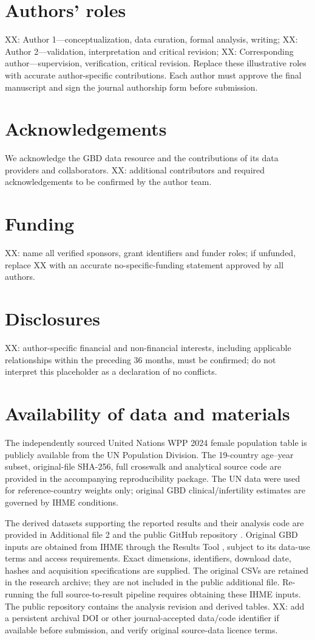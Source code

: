 \documentclass[11pt,a4paper]{article}
\begin{document}
\section*{Authors' roles}
XX: Author 1---conceptualization, data curation, formal analysis, writing; XX: Author 2---validation, interpretation and critical revision; XX: Corresponding author---supervision, verification, critical revision. Replace these illustrative roles with accurate author-specific contributions. Each author must approve the final manuscript and sign the journal authorship form before submission.

\section*{Acknowledgements}
We acknowledge the GBD data resource and the contributions of its data providers and collaborators. XX: additional contributors and required acknowledgements to be confirmed by the author team.


\section*{Funding}
XX: name all verified sponsors, grant identifiers and funder roles; if unfunded, replace XX with an accurate no-specific-funding statement approved by all authors.

\section*{Disclosures}
XX: author-specific financial and non-financial interests, including applicable relationships within the preceding 36 months, must be confirmed; do not interpret this placeholder as a declaration of no conflicts.

\section*{Availability of data and materials}
The independently sourced United Nations WPP 2024 female population table is publicly available from the UN Population Division. The 19-country age--year subset, original-file SHA-256, full crosswalk and analytical source code are provided in the accompanying reproducibility package. The UN data were used for reference-country weights only; original GBD clinical/infertility estimates are governed by IHME conditions.

The derived datasets supporting the reported results and their analysis code are provided in Additional file 2 and the public GitHub repository \cite{repository}. Original GBD inputs are obtained from IHME through the Results Tool \cite{results}, subject to its data-use terms and access requirements. Exact dimensions, identifiers, download date, hashes and acquisition specifications are supplied. The original CSVs are retained in the research archive; they are not included in the public additional file. Re-running the full source-to-result pipeline requires obtaining these IHME inputs. The public repository contains the analysis revision and derived tables. XX: add a persistent archival DOI or other journal-accepted data/code identifier if available before submission, and verify original source-data licence terms.
\end{document}
